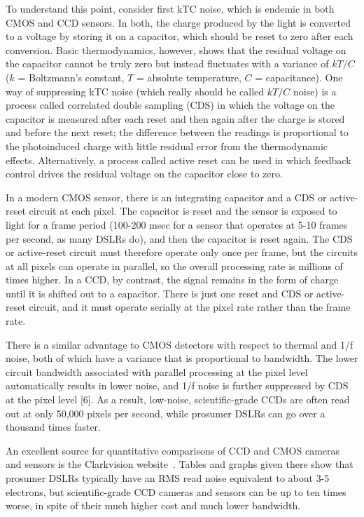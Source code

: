 To understand this point, consider first kTC noise, which is endemic in both CMOS and CCD sensors. In both, the charge produced by the light is converted to a voltage by storing it on a capacitor, which should be reset to zero after each conversion. Basic thermodynamics, however, shows that the residual voltage on the capacitor cannot be truly zero but instead fluctuates with a variance of $kT/C$ ($k$ = Boltzmann's constant, $T$ = absolute temperature, $C$ = capacitance). One way of suppressing kTC noise (which really should be called $kT/C$ noise) is a process called correlated double sampling (CDS) in which the voltage on the capacitor is measured after each reset and then again after the charge is stored and before the next reset; the difference between the readings is proportional to the photoinduced charge with little residual error from the thermodynamic effects. Alternatively, a process called active reset can be used in which feedback control drives the residual voltage on the capacitor close to zero. 

In a modern CMOS sensor, there is an integrating capacitor and a CDS or active-reset circuit at each pixel. The capacitor is reset and the sensor is exposed to light for a frame period (100-200 msec for a sensor that operates at 5-10 frames per second, as many DSLRs do), and then the capacitor is reset again. The CDS or active-reset circuit must therefore operate only once per frame, but the circuits at all pixels can operate in parallel, so the overall processing rate is millions of times higher. In a CCD, by contrast, the signal remains in the form of charge until it is shifted out to a capacitor. There is just one reset and CDS or active-reset circuit, and it must operate serially at the pixel rate rather than
the frame rate.

There is a similar advantage to CMOS detectors with respect to thermal and 1/f noise, both of which have a variance that is proportional to bandwidth. The lower circuit bandwidth associated with parallel processing at the pixel level automatically results in lower noise, and 1/f noise is further suppressed by CDS at the pixel level [6]. As a result, low-noise, scientific-grade CCDs are often read out at only 50,000 pixels per second, while prosumer DSLRs can go over a thousand times faster.

An excellent source for quantitative comparisons of CCD and CMOS cameras and sensors is the Clarkvision website~\citep{clarkvision}. Tables and graphs given there show that prosumer DSLRs typically have an RMS read noise equivalent to about 3-5 electrons, but scientific-grade CCD cameras and sensors can be up to ten times worse, in spite of their much higher cost and much lower bandwidth.

